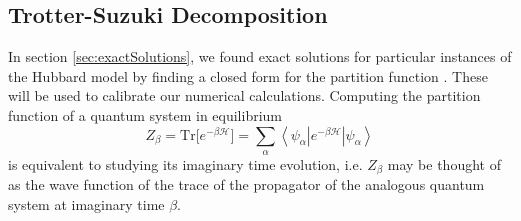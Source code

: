 \subsection{Trotter-Suzuki Decomposition}
\label{subsec:trotter}

In section \ref{sec:exactSolutions}, we found exact solutions for particular instances of the Hubbard model by finding a closed form for the partition function \cite{hou_numerical_2009}. These will be used to calibrate our numerical calculations.
Computing the partition function of a quantum system in equilibrium
\begin{equation}\label{eq:partitionBeta}
Z_\beta = \text{Tr} \big[ e^{-\beta \mathcal{H} } \big] = \sum_{\alpha} \left\langle \psi_\alpha | e^{-\beta \mathcal{H} } | \psi_\alpha \right\rangle
\end{equation}
is equivalent to studying its imaginary time evolution, i.e. $Z_\beta$ may be thought of as the wave function of the trace of the propagator of the analogous quantum system at imaginary time $\beta$.
%
%
%
%
%
